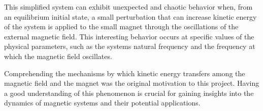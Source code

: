 This simplified system can exhibit unexpected and chaotic behavior when, from an equilibrium initial state, a small perturbation that can increase kinetic energy of the system is applied to the small magnet through the oscillations of the external magnetic field. This interesting behavior occurs at specific values of the physical parameters, such as the system\textquotesingle s natural frequency and the frequency at which the magnetic field oscillates.

Comprehending the mechanisms by which kinetic energy transfers among the magnetic field and the magnet was the original motivation to this project. Having a good understanding of this phenomenon is crucial for gaining insights into the dynamics of magnetic systems and their potential applications.




